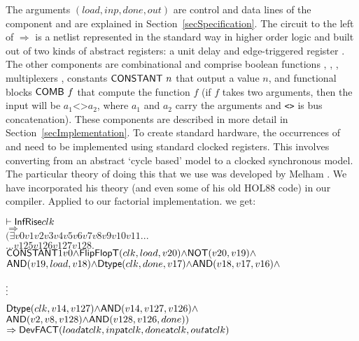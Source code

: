 \documentclass{llncs}
\begin{document}
The arguments $(load,inp,done,out)$ are control and data lines of the
component and are explained in Section~\ref{secSpecification}. The
circuit to the left of $\Rightarrow$ is a netlist represented in the
standard way in higher order logic \cite{Mel93} and built out of two
kinds of abstract registers: a unit delay  and edge-triggered
register . The other components are combinational and
comprise boolean functions ,
, , multiplexers , constants $\mathsf{CONSTANT}~n$ that output a value $n$,
and functional blocks
$\mathsf{COMB}~f$ that compute the function $f$ (if $f$ takes two arguments,
then the input will be $a_1\texttt{<>}a_2$, where $a_1$ and $a_2$ carry the arguments
and \texttt{<>} is bus concatenation). These components are
described in more detail in Section~\ref{secImplementation}. To
create standard hardware, the occurrences of
 and  need to be implemented using standard
clocked registers. This involves converting from an abstract `cycle
based' model to a clocked synchronous model. The particular theory of
doing this that we use was developed by Melham \cite{Mel93}. We have
incorporated his theory (and even some of his old HOL88 code) in
our compiler. Applied to our factorial implementation.
we get:


{\baselineskip10pt\begin{alltt}
\( \vdash \DEF{InfRise} clk                                                                        \)
\(   \Rightarrow                                                                                   \)
\(   ({\exists}v0 v1 v2 v3 v4 v5 v6 v7 v8 v9 v10 v11 ...                               \)
\(     ... v125 v126 v127 v128.                                                                   \)
\(     \DEF{CONSTANT} 1 v0 {\wedge} \DEF{FlipFlopT}(clk,load,v20) {\wedge} \DEF{NOT}(v20,v19) {\wedge}        \)
\(     \DEF{AND}(v19,load,v18) {\wedge} \DEF{Dtype}(clk,done,v17) {\wedge} \DEF{AND}(v18,v17,v16) {\wedge} \)

       \(\raisebox{3mm}{\vdots}\)
\(     \DEF{Dtype}(clk,v14,v127) {\wedge} \DEF{AND}(v14,v127,v126) {\wedge}  \)
\(     \DEF{AND} (v2,v8,v128) {\wedge} \DEF{AND}(v128,v126,done))               \)
\(   \Rightarrow \DEF{Dev} \DEF{FACT} (load \DEF{at} clk, inp \DEF{at} clk, done \DEF{at} clk, out \DEF{at} clk) \)
\end{alltt}}

\end{document}
